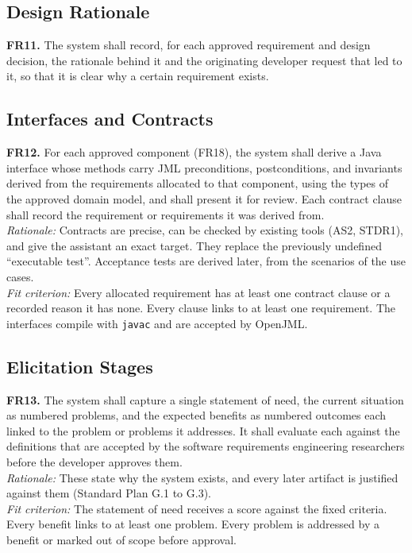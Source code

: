 \documentclass[12pt]{article}
\begin{document}
\subsection{Design Rationale}

\medskip
\noindent\textbf{FR11.} The system shall record, for each approved requirement
and design decision, the rationale behind it and the originating developer
request that led to it, so that it is clear why a certain requirement exists. 

\subsection{Interfaces and Contracts}

\medskip
\noindent\textbf{FR12.} For each approved component (FR18), the system shall derive
a Java interface whose methods carry JML preconditions, postconditions, and
invariants derived from the requirements allocated to that component, using the
types of the approved domain model, and shall present it for review. Each
contract clause shall record the requirement or requirements it was derived
from.\\
\textit{Rationale:} Contracts are precise, can be checked by existing tools
(AS2, STDR1), and give the assistant an exact target. They replace the
previously undefined ``executable test''. Acceptance tests are derived later,
from the scenarios of the use cases.\\
\textit{Fit criterion:} Every allocated requirement has at least one contract
clause or a recorded reason it has none. Every clause links to at least one
requirement. The interfaces compile with \texttt{javac} and are accepted by
OpenJML.

\subsection{Elicitation Stages}

\medskip
\noindent\textbf{FR13.} The system shall capture a single statement of need, the
current situation as numbered problems, and the expected benefits as numbered
outcomes each linked to the problem or problems it addresses. It shall evaluate
each against the definitions that are accepted by the software requirements engineering researchers before the developer
approves them.\\
\textit{Rationale:} These state why the system exists, and every later artifact
is justified against them (Standard Plan G.1 to G.3).\\
\textit{Fit criterion:} The statement of need receives a score against the fixed
criteria. Every benefit links to at least one problem. Every problem is
addressed by a benefit or marked out of scope before approval.
\end{document}
